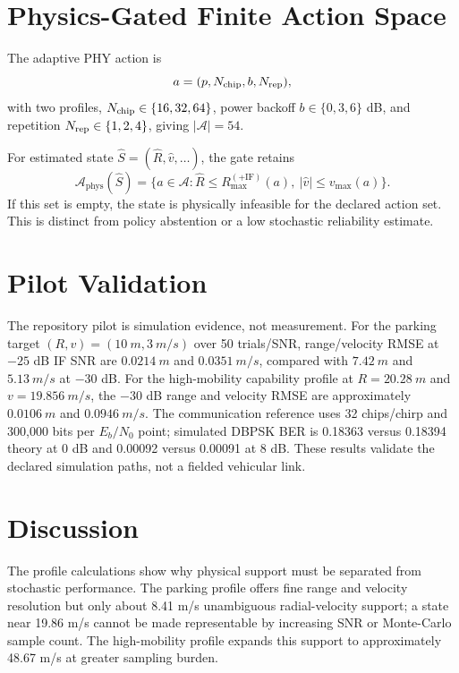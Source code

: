 \documentclass[conference,a4paper]{IEEEtran}
\begin{document}
\section{Physics-Gated Finite Action Space}
The adaptive PHY action is
\begin{equation}
a=(p,N_{\rm chip},b,N_{\rm rep}),
\end{equation}
with two profiles, $N_{\rm chip}\in\{16,32,64\}$, power backoff $b\in\{0,3,6\}$ dB, and repetition $N_{\rm rep}\in\{1,2,4\}$, giving $|\mathcal A|=54$.

For estimated state $\hat S=(\hat R,\hat v,\ldots)$, the gate retains
\begin{equation}
\mathcal{A}_{\mathrm{phys}}(\hat S)=\{a\in\mathcal{A}:\hat R\le R_{\max}^{(+\mathrm{IF})}(a),\ |\hat v|\le v_{\max}(a)\}.
\end{equation}
If this set is empty, the state is physically infeasible for the declared action set. This is distinct from policy abstention or a low stochastic reliability estimate.

\section{Pilot Validation}
The repository pilot is simulation evidence, not measurement. For the parking target $(R,v)=(\SI{10}{m},\SI{3}{m/s})$ over 50 trials/SNR, range/velocity RMSE at $-25$ dB IF SNR are $\SI{0.0214}{m}$ and $\SI{0.0351}{m/s}$, compared with $\SI{7.42}{m}$ and $\SI{5.13}{m/s}$ at $-30$ dB. For the high-mobility capability profile at $R=\SI{20.28}{m}$ and $v=\SI{19.856}{m/s}$, the $-30$ dB range and velocity RMSE are approximately $\SI{0.0106}{m}$ and $\SI{0.0946}{m/s}$. The communication reference uses 32 chips/chirp and 300,000 bits per $E_b/N_0$ point; simulated DBPSK BER is 0.18363 versus 0.18394 theory at 0 dB and 0.00092 versus 0.00091 at 8 dB. These results validate the declared simulation paths, not a fielded vehicular link.

\figPaperOneCapability
\figPaperOnePilot


\section{Discussion}
The profile calculations show why physical support must be separated from stochastic performance. The parking profile offers fine range and velocity resolution but only about 8.41 m/s unambiguous radial-velocity support; a state near 19.86 m/s cannot be made representable by increasing SNR or Monte-Carlo sample count. The high-mobility profile expands this support to approximately 48.67 m/s at greater sampling burden.
\end{document}

